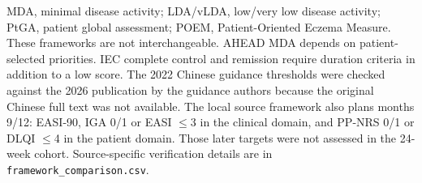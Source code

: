 {\begin{longtable}{p{27mm}p{43mm}p{51mm}p{38mm}}
\bottomrule\end{longtable}
MDA, minimal disease activity; LDA/vLDA, low/very low disease activity; PtGA, patient global assessment; POEM, Patient-Oriented Eczema Measure. These frameworks are not interchangeable. AHEAD MDA depends on patient-selected priorities. IEC complete control and remission require duration criteria in addition to a low score. The 2022 Chinese guidance thresholds were checked against the 2026 publication by the guidance authors because the original Chinese full text was not available. The local source framework also plans months 9/12: EASI-90, IGA 0/1 or EASI $\leq$3 in the clinical domain, and PP-NRS 0/1 or DLQI $\leq$4 in the patient domain. Those later targets were not assessed in the 24-week cohort. Source-specific verification details are in \texttt{framework\_comparison.csv}.
}
